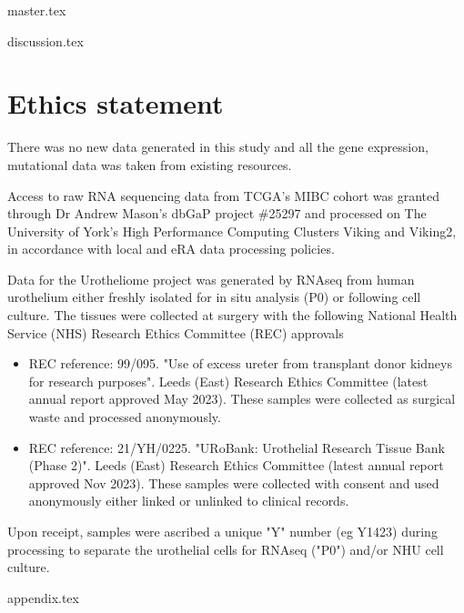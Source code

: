 \documentclass[a4paper, 12pt]{report}
\begin{document}
{master.tex}

{discussion.tex}


\chapter{Ethics statement}

There was no new data generated in this study and all the gene expression, mutational data was taken from existing resources.

Access to raw RNA sequencing data from TCGA's MIBC cohort was granted through Dr Andrew Mason's dbGaP project \#25297 and processed on The University of York's High Performance Computing Clusters Viking and Viking2, in accordance with local and eRA data processing policies.

Data for the Urotheliome project was generated by RNAseq from human urothelium either freshly isolated for in situ analysis (P0) or following cell culture. The tissues were collected at surgery with the following National Health Service (NHS) Research Ethics Committee (REC) approvals

\begin{itemize}
    \item REC reference: 99/095. "Use of excess ureter from transplant donor kidneys for research purposes". Leeds (East) Research Ethics Committee (latest annual report approved May 2023). These samples were collected as surgical waste and processed anonymously.
    \item REC reference: 21/YH/0225. "URoBank: Urothelial Research Tissue Bank (Phase 2)". Leeds (East) Research Ethics Committee (latest annual report approved Nov 2023). These samples were collected with consent and used anonymously either linked or unlinked to clinical records.  
\end{itemize}

Upon receipt, samples were ascribed a unique "Y" number (eg Y1423) during processing to separate the urothelial cells for RNAseq ("P0") and/or NHU cell culture.

{appendix.tex}







\end{document}
